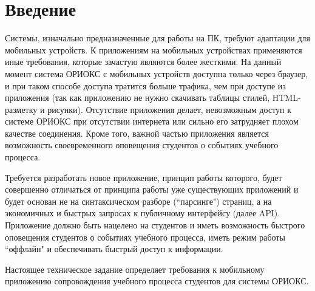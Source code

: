 \chapter{Введение}
\label{ch:intro}

Системы, изначально предназначенные для работы на ПК, требуют адаптации для мобильных устройств. К приложениям на мобильных устройствах применяются иные требования, которые зачастую являются более жесткими. На данный момент система ОРИОКС с мобильных устройств доступна только через браузер, и при таком способе доступа тратится больше трафика, чем при доступе из приложения (так как приложению не нужно скачивать таблицы стилей, HTML-разметку и рисунки).
Отсутствие приложения делает, невозможным доступ к системе ОРИОКС при отсутствии интернета или сильно его затрудняет плохом качестве соединения.
Кроме того, важной частью приложения является возможность своевременного оповещения студентов о событиях учебного процесса.

Требуется разработать новое приложение, принцип работы которого, будет совершенно отличаться от принципа работы уже существующих приложений и будет основан не на синтаксическом разборе (``парсинге") страниц, а на экономичных и быстрых запросах к публичному интерфейсу (далее API).
Приложение должно быть нацелено на студентов и иметь возможность быстрого оповещения студентов о событиях учебного процесса, иметь режим работы ``оффлайн" и обеспечивать быстрый доступ к информации.

Настоящее техническое задание определяет требования к мобильному приложению сопровождения учебного процесса студентов для системы ОРИОКС.
